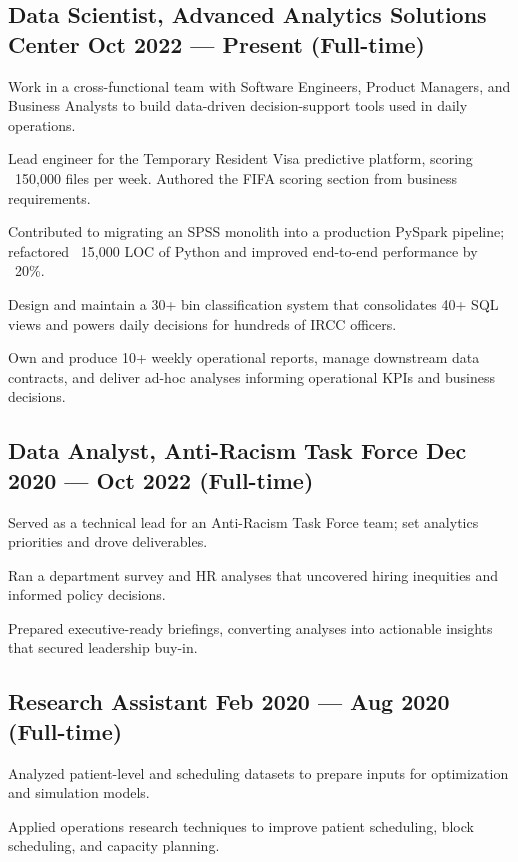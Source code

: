 \subsection{{Data Scientist, Advanced Analytics Solutions Center \hfill Oct 2022 --- Present (Full-time)}}
\begin{zitemize}
    \item Work in a cross-functional team with Software Engineers, Product Managers, and Business Analysts to build data-driven decision-support tools used in daily operations.
    \item Lead engineer for the Temporary Resident Visa predictive platform, scoring ~150{,}000 files per week. Authored the FIFA scoring section from business requirements.
    \item Contributed to migrating an SPSS monolith into a production PySpark pipeline; refactored ~15{,}000 LOC of Python and improved end-to-end performance by ~20\%.
    \item Design and maintain a 30+ bin classification system that consolidates 40+ SQL views and powers daily decisions for hundreds of IRCC officers.
    \item Own and produce 10+ weekly operational reports, manage downstream data contracts, and deliver ad-hoc analyses informing operational KPIs and business decisions.
\end{zitemize}

\subsection{{Data Analyst, Anti-Racism Task Force \hfill Dec 2020 --- Oct 2022 (Full-time)}}
\begin{zitemize}
    \item Served as a technical lead for an Anti-Racism Task Force team; set analytics priorities and drove deliverables.
    \item Ran a department survey and HR analyses that uncovered hiring inequities and informed policy decisions.
    \item Prepared executive-ready briefings, converting analyses into actionable insights that secured leadership buy-in.
\end{zitemize}

\subsection{{Research Assistant \hfill Feb 2020 --- Aug 2020 (Full-time)}}
\begin{zitemize}
    \item Analyzed patient-level and scheduling datasets to prepare inputs for optimization and simulation models.
    \item Applied operations research techniques to improve patient scheduling, block scheduling, and capacity planning.
\end{zitemize}

